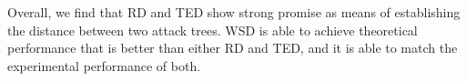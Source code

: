 Overall, we find that RD and TED show strong promise as means of establishing the distance between two attack trees. WSD is able to achieve theoretical performance that is better than either RD and TED, and it is able to match the experimental performance of both.





















































































